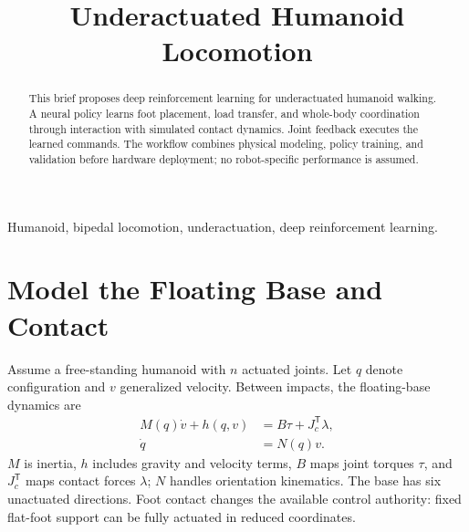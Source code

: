 

\title{Underactuated Humanoid Locomotion}
\author{
}
\date{}


\maketitle

\begin{abstract}
This brief proposes deep reinforcement learning for underactuated humanoid
walking. A neural policy learns foot placement, load transfer, and whole-body
coordination through interaction with simulated contact dynamics. Joint
feedback executes the learned commands. The workflow combines physical
modeling, policy training, and validation before hardware deployment; no
robot-specific performance is assumed.
\end{abstract}

\begin{IEEEkeywords}
Humanoid, bipedal locomotion, underactuation, deep reinforcement learning.
\end{IEEEkeywords}

\balance
\section{Model the Floating Base and Contact}
Assume a free-standing humanoid with $n$ actuated joints. Let $q$ denote
configuration and $v$ generalized velocity. Between impacts, the
floating-base dynamics are~\cite{tedrakeContact}
\begin{equation}
\begin{aligned}
M(q)\dot v+h(q,v)&=B\tau+J_c^{\mathsf T}\lambda,\\
\dot q&=N(q)v.
\end{aligned}
\end{equation}
$M$ is inertia, $h$ includes gravity and velocity terms, $B$ maps joint
torques $\tau$, and $J_c^{\mathsf T}$ maps contact forces $\lambda$; $N$
handles orientation kinematics. The base has six unactuated directions.
Foot contact changes the available control authority: fixed flat-foot
support can be fully actuated in reduced coordinates.


